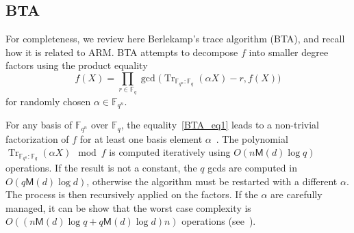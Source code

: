 \documentclass{sig-alternate}
\newcommand{\ff}[1]{\mathbb{F}_{#1}}
\newcommand{\fq}{\ff{q}}
\newcommand{\fqn}{\ff{q^n}}
\newcommand{\dd}{d}
\newcommand{\qq}{q}
\newcommand{\nn}{n}
\newcommand{\qn}{{\qq^\nn}}
\newcommand{\basef}{\ff{\qq}}
\newcommand{\extf}{\ff{\qn}}
\DeclareMathOperator{\Tr}{Tr}
\newcommand{\trabs}[2]{\Tr_{#1:#2}}
\newcommand{\trextbase}{\trabs{\extf}{\basef}}
\newcommand{\bigO}{O}
\newcommand{\Mul}{\mathsf{M}}
\newcounter{algo}
\newtheorem{Lem}{Lemma}
\begin{document}
 
 
 
 \subsection{BTA}
\label{sec:bta}

For completeness, we review here Berlekamp's trace algorithm (BTA),
and recall how it is related to ARM. BTA attempts to decompose $f$
into smaller degree factors using the product equality
\begin{equation}\label{BTA_eq1}
f(X)=\prod_{r\in\fq}\gcd\bigl(\trextbase(\alpha X)-r,f(X)\bigr)
\end{equation}
for randomly chosen $\alpha\in\fqn$.



%
For any basis of $\extf$ over $\basef$, the equality~\eqref{BTA_eq1} leads to a non-trivial factorization of $f$ for at least one basis element $\alpha$~\cite{berl70}.
The polynomial $\trextbase(\alpha X) \mod f$ is computed iteratively using
$O(\nn\Mul(d)\log\qq)$ operations. If the result is not a constant,
the $\qq$ gcds are computed in $O(\qq\Mul(d)\log\dd)$, otherwise the
algorithm must be restarted with a different $\alpha$. 
The process is then recursively applied on the factors. 
 If the $\alpha$ are carefully managed, it can be show that the worst case complexity is 
$\bigO((\nn\Mul(d)\log\qq+\qq\Mul(d)\log\dd) \nn)$ 
operations (see~\cite{Menvanovans92}).




\end{document}
